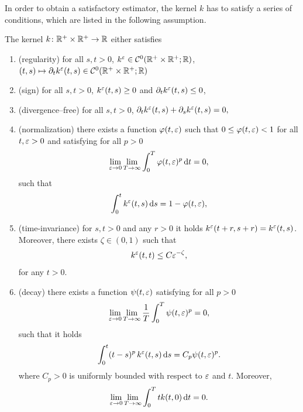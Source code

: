 \documentclass[10pt]{article}
\begin{document}
In order to obtain a satisfactory estimator, the kernel $k$ has to satisfy a series of conditions, which are listed in the following assumption.
\begin{assumption}\label{as:kern} The kernel $k \colon \mathbb{R}^+ \times \mathbb{R}^+ \to \mathbb{R}$ either satisfies
\begin{enumerate}[label=(\roman*)]
	\item \label{as:kernReg} (regularity) for all $s, t > 0$, $k^\varepsilon\in \mathcal C^0(\mathbb{R}^+\times\mathbb{R}^+; \mathbb{R})$, $(t,s) \mapsto \partial_t k^\varepsilon(t, s) \in \mathcal C^0(\mathbb{R}^+\times\mathbb{R}^+; \mathbb{R})$ 
	\item \label{as:kernPos} (sign) for all $s, t > 0$, $k^\varepsilon(t, s) \geq 0$ and $\partial_t k^\varepsilon(t, s) \leq 0$,
	\item \label{as:kernDivFree} (divergence--free) for all $s, t > 0$, $\partial_t k^\varepsilon(t, s) + \partial_s k^\varepsilon(t, s) = 0, $
	\item \label{as:kernNorm} (normalization) there exists a function $\varphi(t, \varepsilon)$ such that $0 \leq \varphi(t, \varepsilon) < 1$ for all $t, \varepsilon > 0$ and satisfying for all $p > 0$
	\begin{equation}
		\lim_{\varepsilon\to 0} \lim_{T\to\infty} \int_0^T \varphi(t, \varepsilon)^p \,\mathrm{d} t = 0,
	\end{equation}
	such that
	\begin{equation}
		\int_0^t k^\varepsilon(t, s) \,\mathrm{d} s = 1 - \varphi(t, \varepsilon),
	\end{equation}	
	\item \label{as:kernTimeInv} (time-invariance) for $s, t > 0$ and any $r > 0$ it holds $k^\varepsilon(t+r, s+r) = k^\varepsilon(t, s)$. Moreover, there exists $\zeta \in (0, 1)$ such that
	\begin{equation}
		k^\varepsilon(t, t) \leq C \varepsilon^{-\zeta},
	\end{equation}
	for any $t > 0$.
	\item\label{as:kernVanish} (decay) there exists a function $\psi(t, \varepsilon)$ satisfying for all $p > 0$
	\begin{equation}
		 \lim_{\varepsilon\to 0} \lim_{T\to\infty} \frac1T \int_0^T \psi(t, \varepsilon)^p = 0,
	\end{equation} 
	such that it holds 
	\begin{equation}
		\int_0^t (t-s)^p \, k^\varepsilon(t, s) \,\mathrm{d} s = C_p \psi(t, \varepsilon)^p.
	\end{equation}
	where $C_p > 0$ is uniformly bounded with respect to $\varepsilon$ and $t$. Moreover, 
	\begin{equation}
		\lim_{\varepsilon \to 0} \lim_{T\to\infty}\int_0^T t  k(t, 0) \,\mathrm{d} t = 0.
	\end{equation} 
\end{enumerate}	
\end{assumption}
\end{document}
